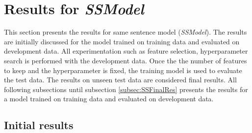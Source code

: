 \section{Results for \textit{SSModel}}

This section presents the results for same sentence model (\textit{SSModel}). The results are initially discussed for the model trained on training data and evaluated on development data. All experimentation such as feature selection, hyperparameter search is performed with the development data. Once the the number of features to keep and the hyperparameter is fixed, the training model is used to evaluate the test data. The results on unseen test data are considered final results. All following subsections until subsection \ref{subsec:SSFinalRes} presents the results for a model trained on training data and evaluated on development data.

 
\subsection{Initial results}

